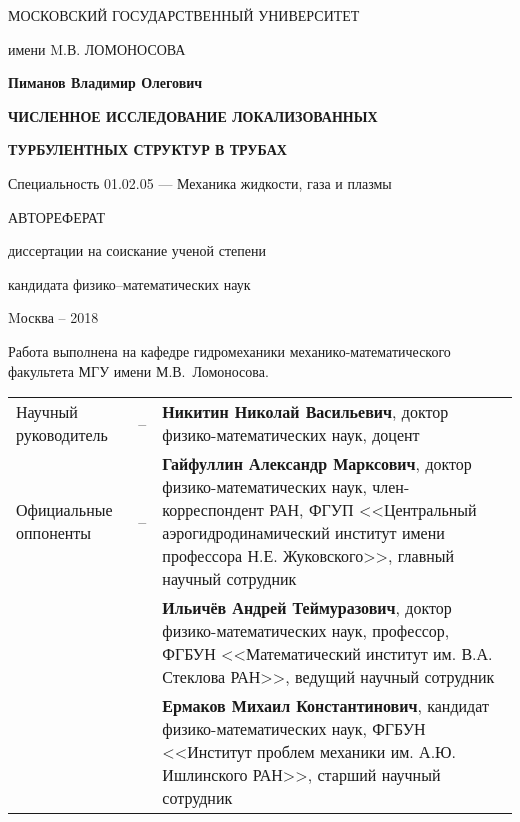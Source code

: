 \documentclass[a4paper,14pt,
oneside]{extbook}
\begin{document}
 \sloppy

\thispagestyle{empty}
\centerline{МОСКОВСКИЙ ГОСУДАРСТВЕННЫЙ УНИВЕРСИТЕТ}
\centerline{имени M.В. ЛОМОНОСОВА}

\vfill

\vfill
\vfill

\centerline{\bf Пиманов Владимир Олегович} \vfill
\centerline{\bf ЧИСЛЕННОЕ ИССЛЕДОВАНИЕ ЛОКАЛИЗОВАННЫХ}
\centerline{\bf ТУРБУЛЕНТНЫХ СТРУКТУР В ТРУБАХ}
 \centerline{\bf}
 \centerline{\bf }
\centerline{Специальность 01.02.05
--- Механика жидкости, газа и плазмы} 
\vfill \vfill
\centerline{АВТОРЕФЕРАТ}
\centerline{диссертации на соискание ученой степени} 
\centerline{кандидата физико--математических наук} 
\vfill \vfill \vfill \vfill 
\centerline{Mосква -- 2018}
\normalsize


\newcommand{\vsp}{\vspace{0.25cm}}

\newpage
\thispagestyle{empty} Работа выполнена на кафедре гидромеханики механико-математического факультета МГУ имени М.В.~Ломоносова.

\vsp

\noindent \begin{tabular}{@{}p{5.6cm}p{0.3cm}p{10.7cm}@{}}
Научный руководитель & -- & \textbf{Никитин Николай Васильевич},
доктор физико-математических наук, доцент\vsp \\
Официальные оппоненты &  -- & \textbf{Гайфуллин Александр Марксович},
доктор физико-математических наук, член-кор\-респондент РАН,
ФГУП <<Центральный аэрогидродинамический институт имени профессора Н.Е. Жуковского>>, главный научный сотрудник\vsp\\
&  & 
\textbf{Ильичёв Андрей Теймуразович},
доктор физико-математических наук, профессор,
ФГБУН <<Математический институт им. В.А. Стеклова РАН>>,
ведущий научный сотрудник\vsp\\
&  & 
\textbf{Ермаков Михаил Константинович},
кандидат физико-математических наук, ФГБУН <<Институт проблем механики им. А.Ю. Ишлинского РАН>>,
старший научный сотрудник\vsp\\
\end{tabular}
\vspace{1mm}
\end{document}
